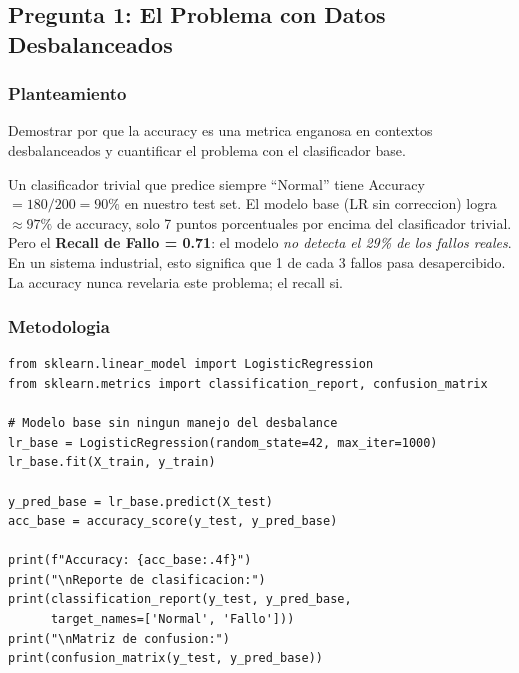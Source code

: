 \documentclass[12pt,a4paper]{article}
\begin{document}
\subsection{Pregunta 1: El Problema con Datos Desbalanceados}

\subsubsection*{Planteamiento}
Demostrar por que la accuracy es una metrica enganosa en contextos desbalanceados y cuantificar
el problema con el clasificador base.

\begin{tcolorbox}[porquebox, title={Por que accuracy es misleading con datos desbalanceados?}]
Un clasificador trivial que predice siempre ``Normal'' tiene Accuracy $= 180/200 = 90\%$ en
nuestro test set. El modelo base (LR sin correccion) logra $\approx 97\%$ de accuracy, solo
7 puntos porcentuales por encima del clasificador trivial. Pero el \textbf{Recall de Fallo =
0.71}: el modelo \textit{no detecta el 29\% de los fallos reales}. En un sistema industrial,
esto significa que 1 de cada 3 fallos pasa desapercibido. La accuracy nunca revelaria este
problema; el recall si.
\end{tcolorbox}

\subsubsection*{Metodologia}

\begin{lstlisting}[caption={Baseline con Regresion Logistica sin correccion}]
from sklearn.linear_model import LogisticRegression
from sklearn.metrics import classification_report, confusion_matrix

# Modelo base sin ningun manejo del desbalance
lr_base = LogisticRegression(random_state=42, max_iter=1000)
lr_base.fit(X_train, y_train)

y_pred_base = lr_base.predict(X_test)
acc_base = accuracy_score(y_test, y_pred_base)

print(f"Accuracy: {acc_base:.4f}")
print("\nReporte de clasificacion:")
print(classification_report(y_test, y_pred_base,
      target_names=['Normal', 'Fallo']))
print("\nMatriz de confusion:")
print(confusion_matrix(y_test, y_pred_base))
\end{lstlisting}
\end{document}
